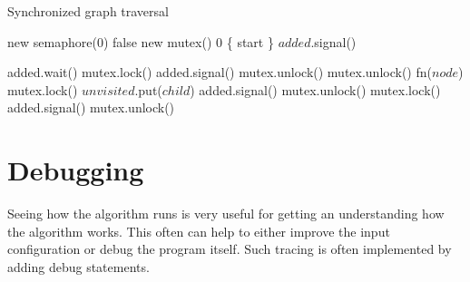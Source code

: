 \begin{algorithm}
    \label{synctravel}
    \caption{Synchronized graph traversal}
\begin{algorithmic}[1]

             {new semaphore(0)}
         {false}
             {new mutex()}
           {0}
         {\{ start \}}
        \State $added$.signal()
        
        \Spawn
                \State added.wait() 
                \State mutex.lock() 
                    \State added.signal() 
                    \State mutex.unlock()
                \EndIf
                 \Comment{}
                \State mutex.unlock() 
                \State fn($node$) 
                    \State mutex.lock() 
                        \State $unvisited$.put($child$)
                        \State added.signal()
                    \EndIf
                    \State mutex.unlock()
                \EndFor
                \State mutex.lock() 
                    \State added.signal() 
                \EndIf
                \State mutex.unlock()
            \EndWhile
        \EndSpawn

    \EndFunction
\end{algorithmic}
\end{algorithm}

\section{Debugging}

Seeing how the algorithm runs is very useful for getting an understanding how the algorithm works. This often can help to either improve the input configuration or debug the program itself. Such tracing is often implemented by adding debug statements.

